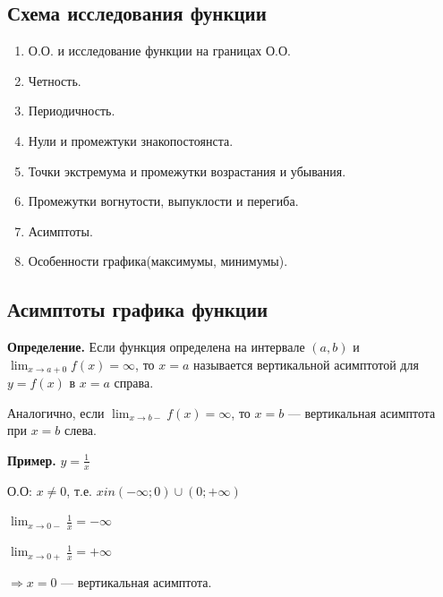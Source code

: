 \documentclass{article}
\begin{document}
\subsection{Схема исследования функции}

\begin{enumerate}
    \item О.О. и исследование функции на границах О.О.
    \item Четность.
    \item Периодичность.
    \item Нули и промежтуки знакопостоянста.
    \item Точки экстремума и промежутки возрастания и убывания.
    \item Промежутки вогнутости, выпуклости и перегиба.
    \item Асимптоты.
    \item Особенности графика(максимумы, минимумы).
\end{enumerate}

\subsection{Асимптоты графика функции}

\textbf{Определение.} Если функция определена на интервале \( (a, b) \) и \( \lim_{x \to a+0} f(x) = \infty \), то \( x = a \) называется вертикальной асимптотой для \( y = f(x) \) в \( x = a \) справа.

Аналогично, если \(\lim_{x \to b-} f(x) = \infty\), то \(x = b\) --- вертикальная асимптота при \(x = b\) слева.

\textbf{Пример.} \( y = \frac{1}{x} \)

О.О: \( x \neq 0 \), т.е. \( x in (-\infty; 0) \cup (0; +\infty) \)

\( \lim_{x \to 0-} \frac{1}{x} = -\infty \)

\( \lim_{x \to 0+} \frac{1}{x} = +\infty \) 

\( \Rightarrow x = 0 \) --- вертикальная асимптота.
\end{document}
